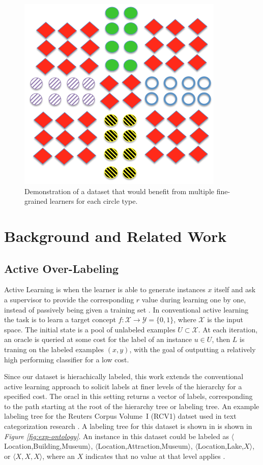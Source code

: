 \documentclass[ms]{nuthesis}
\begin{document}
\FloatBarrier
\begin{figure}[!htb]
	\centering
    \includegraphics[width=0.5\columnwidth]{fig/union}
    \caption{Demonstration of a dataset that would benefit from multiple fine-grained
    learners for each circle type.}
    \label{fig:union}
\end{figure}
\FloatBarrier


\chapter{Background and Related Work}
\section{Active Over-Labeling}
\par Active Learning is when the learner is able to generate instances $x$ itself
and ask a supervisor to provide the corresponding $r$ value during learning one by
one, instead of passively being given a training set \cite{mitchell}. In conventional
active learning the task is to learn a target concept
$f : {\mathcal X} \rightarrow {\mathcal Y}=\{0, 1\} $, where $\mathcal X$
is the input space. The initial state is a pool of unlabeled examples
$U \subset {\mathcal X}$. At each iteration, an oracle is queried at some
cost for the label of an instance $u \in U$, then $L$ is traning on the labeled examples
$(x,y)$, with the goal of outputting a relatively high performing classifier for a low cost.
\par Since our dataset is hierachically labeled, this work extends the conventional active
learning approach to solicit labels at finer levels of the hierarchy for a specified cost.
 The oracl in this setting returns a vector of labels, corresponding to the path starting
 at the root of the hierarchy tree or labeling tree. An example labeling tree for the
 Reuters Corpus Volume~I (RCV1) datset used in text categorization research \cite{Lewis2004}.
 A labeling tree for this dataset is shown in is shown in
 \textit{Figure \ref{fig:exp-ontology}}. An instance in this dataset could be labeled as
 $\langle$Location,Building,Museum$\rangle$,  $\langle$Location,Attraction,Museum$\rangle$,
$\langle$Location,Lake,$X\rangle$, or $\langle X,X,X \rangle$, where an $X$ indicates
that no value at that level applies \cite{yugi}.
\end{document}
